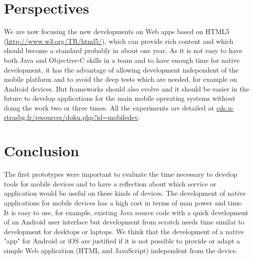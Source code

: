 \section{Perspectives}
We are now focusing the new developments on Web apps based on HTML5 (\url{http://www.w3.org/TR/html5/}), which can provide rich content and which should become a standard probably in about one year. As it is not easy to have both Java and Objective-C skills in a team and to have enough time for native development, it has the advantage of allowing development independent of the mobile platform and to avoid the deep tests which are needed, for example on Android devices. But frameworks should also evolve and it should be easier in the future to develop applications for the main mobile operating systems without doing the work two or three times. All the experiments are detailed at \url{cds.u-strasbg.fr/resources/doku.php?id=mobiledev}.

\section{Conclusion}
The first prototypes were important to evaluate the time necessary to develop tools for mobile devices and to have a reflection about which service or application would be useful on these kinds of devices. The development of native applications for mobile devices has a high cost in terms of man power and time. It is easy to use, for example, existing Java source code with a quick development of an Android user interface but development from scratch needs time similar to development for desktops or laptops. We think that the development of a native "app" for Android or iOS are justified if it is not possible to provide or adapt a simple Web application (HTML and JavaScript) independent from the device.


